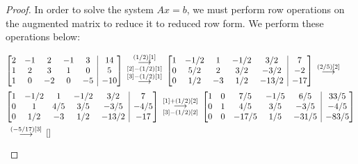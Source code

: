 \documentclass[12pt]{article}
\makeatletter
\theoremstyle{definition}
\newenvironment{amatrix}[1]{%
  \left[\begin{array}{@{}*{#1}{c}|c@{}}
}{%
  \end{array}\right]
}
\newcommand{\grstep}[2][\relax]{%
   \ensuremath{\mathrel{
       {\mathop{\longrightarrow}\limits^{#2\mathstrut}_{
                                     \begin{subarray}{l} #1 \end{subarray}}}}}}
\makeatother
\begin{document}
\begin{proof}
  In order to solve the system $Ax=b$, we must perform row operations on the
  augmented matrix to reduce it to reduced row form. We perform these operations below:

  \begin{align*}
    &\begin{amatrix}{5}
      2 & -1 & 2 & -1 & 3 & 14 \\
      1 & 2 & 3 & 1 & 0 & 5 \\
      1 & 0 & -2 & 0 & -5 & -10 \\
    \end{amatrix}
    \begin{array}{c}
    \grstep[{[2] - (1/2)[1]}]{(1/2)[1]} \\
    \grstep[]{[3] - (1/2)[1]}
    \end{array}
    \begin{amatrix}{5}
      1 & -1/2 & 1 & -1/2 & 3/2 & 7 \\
      0 & 5/2 & 2 & 3/2 & -3/2 & -2 \\
      0 & 1/2 & -3 & 1/2 & -13/2 & -17 \\
    \end{amatrix}
    \begin{array}{c}
      \grstep[]{(2/5)[2]}
    \end{array}
    \\
    &\begin{amatrix}{5}
      1 & -1/2 & 1 & -1/2 & 3/2 & 7 \\
      0 & 1 & 4/5 & 3/5 & -3/5 & -4/5 \\
      0 & 1/2 & -3 & 1/2 & -13/2 & -17 \\
    \end{amatrix}
    \begin{array}{c}
      \grstep[{[3] - (1/2)[2]}]{[1] + (1/2)[2]} \\
    \end{array}
    \begin{amatrix}{5}
      1 & 0 & 7/5 & -1/5 & 6/5 & 33/5 \\
      0 & 1 & 4/5 & 3/5 & -3/5 & -4/5 \\
      0 & 0 & -17/5 & 1/5 & -31/5 & -83/5 \\
    \end{amatrix}
    \\
    &\begin{array}{c}
      \grstep[]{(-5/17)[3]}
    \end{array}
    \begin{amatrix}{5}

\end{amatrix}
\end{align*}
\end{proof}
\end{document}
